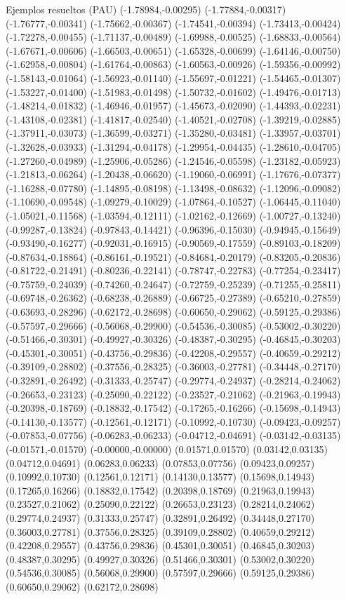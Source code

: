 \documentclass[11pt,a4paper]{article}
\begin{document}
\begin{fmex}{Ejemplos resueltos (PAU)}
(-1.78984,-0.00295) (-1.77884,-0.00317) (-1.76777,-0.00341) (-1.75662,-0.00367) (-1.74541,-0.00394) (-1.73413,-0.00424) (-1.72278,-0.00455) (-1.71137,-0.00489) (-1.69988,-0.00525) (-1.68833,-0.00564) (-1.67671,-0.00606) (-1.66503,-0.00651) (-1.65328,-0.00699) (-1.64146,-0.00750) (-1.62958,-0.00804) (-1.61764,-0.00863) (-1.60563,-0.00926) (-1.59356,-0.00992) (-1.58143,-0.01064) (-1.56923,-0.01140) (-1.55697,-0.01221) (-1.54465,-0.01307) (-1.53227,-0.01400) (-1.51983,-0.01498) (-1.50732,-0.01602) (-1.49476,-0.01713) (-1.48214,-0.01832) (-1.46946,-0.01957) (-1.45673,-0.02090) (-1.44393,-0.02231) (-1.43108,-0.02381) (-1.41817,-0.02540) (-1.40521,-0.02708) (-1.39219,-0.02885) (-1.37911,-0.03073) (-1.36599,-0.03271) (-1.35280,-0.03481) (-1.33957,-0.03701) (-1.32628,-0.03933) (-1.31294,-0.04178) (-1.29954,-0.04435) (-1.28610,-0.04705) (-1.27260,-0.04989) (-1.25906,-0.05286) (-1.24546,-0.05598) (-1.23182,-0.05923) (-1.21813,-0.06264) (-1.20438,-0.06620) (-1.19060,-0.06991) (-1.17676,-0.07377) (-1.16288,-0.07780) (-1.14895,-0.08198) (-1.13498,-0.08632) (-1.12096,-0.09082) (-1.10690,-0.09548) (-1.09279,-0.10029) (-1.07864,-0.10527) (-1.06445,-0.11040) (-1.05021,-0.11568) (-1.03594,-0.12111) (-1.02162,-0.12669) (-1.00727,-0.13240) (-0.99287,-0.13824) (-0.97843,-0.14421) (-0.96396,-0.15030) (-0.94945,-0.15649) (-0.93490,-0.16277) (-0.92031,-0.16915) (-0.90569,-0.17559) (-0.89103,-0.18209) (-0.87634,-0.18864) (-0.86161,-0.19521) (-0.84684,-0.20179) (-0.83205,-0.20836) (-0.81722,-0.21491) (-0.80236,-0.22141) (-0.78747,-0.22783) (-0.77254,-0.23417) (-0.75759,-0.24039) (-0.74260,-0.24647) (-0.72759,-0.25239) (-0.71255,-0.25811) (-0.69748,-0.26362) (-0.68238,-0.26889) (-0.66725,-0.27389) (-0.65210,-0.27859) (-0.63693,-0.28296) (-0.62172,-0.28698) (-0.60650,-0.29062) (-0.59125,-0.29386) (-0.57597,-0.29666) (-0.56068,-0.29900) (-0.54536,-0.30085) (-0.53002,-0.30220) (-0.51466,-0.30301) (-0.49927,-0.30326) (-0.48387,-0.30295) (-0.46845,-0.30203) (-0.45301,-0.30051) (-0.43756,-0.29836) (-0.42208,-0.29557) (-0.40659,-0.29212) (-0.39109,-0.28802) (-0.37556,-0.28325) (-0.36003,-0.27781) (-0.34448,-0.27170) (-0.32891,-0.26492) (-0.31333,-0.25747) (-0.29774,-0.24937) (-0.28214,-0.24062) (-0.26653,-0.23123) (-0.25090,-0.22122) (-0.23527,-0.21062) (-0.21963,-0.19943) (-0.20398,-0.18769) (-0.18832,-0.17542) (-0.17265,-0.16266) (-0.15698,-0.14943) (-0.14130,-0.13577) (-0.12561,-0.12171) (-0.10992,-0.10730) (-0.09423,-0.09257) (-0.07853,-0.07756) (-0.06283,-0.06233) (-0.04712,-0.04691) (-0.03142,-0.03135) (-0.01571,-0.01570) (-0.00000,-0.00000) (0.01571,0.01570) (0.03142,0.03135) (0.04712,0.04691) (0.06283,0.06233) (0.07853,0.07756) (0.09423,0.09257) (0.10992,0.10730) (0.12561,0.12171) (0.14130,0.13577) (0.15698,0.14943) (0.17265,0.16266) (0.18832,0.17542) (0.20398,0.18769) (0.21963,0.19943) (0.23527,0.21062) (0.25090,0.22122) (0.26653,0.23123) (0.28214,0.24062) (0.29774,0.24937) (0.31333,0.25747) (0.32891,0.26492) (0.34448,0.27170) (0.36003,0.27781) (0.37556,0.28325) (0.39109,0.28802) (0.40659,0.29212) (0.42208,0.29557) (0.43756,0.29836) (0.45301,0.30051) (0.46845,0.30203) (0.48387,0.30295) (0.49927,0.30326) (0.51466,0.30301) (0.53002,0.30220) (0.54536,0.30085) (0.56068,0.29900) (0.57597,0.29666) (0.59125,0.29386) (0.60650,0.29062) (0.62172,0.28698) 
\end{fmex}
\end{document}
